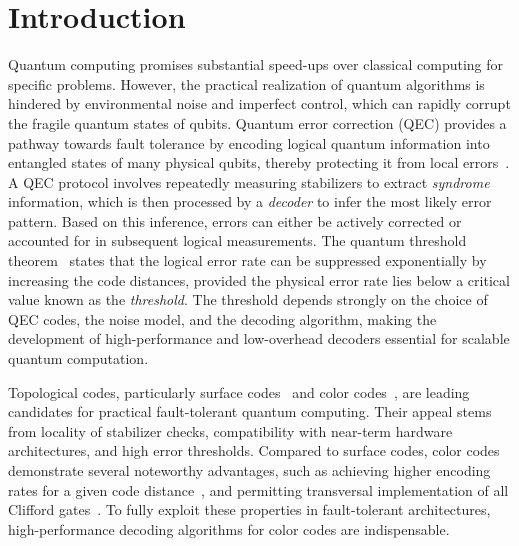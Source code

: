 \documentclass[%
 reprint,
 amsmath,amssymb,
 aps,
]{revtex4-2}
\begin{document}
\maketitle


\section{\label{sec:introduction}Introduction}

Quantum computing promises substantial speed-ups over 
classical computing for specific problems. However, the practical realization of quantum algorithms is hindered by environmental noise and imperfect control, which can rapidly corrupt the fragile quantum states of qubits. Quantum error correction (QEC) provides a pathway towards fault tolerance by encoding logical quantum information into entangled states of many physical qubits, thereby protecting it from local errors~\cite{shor1995scheme,shor1996fault,calderbank1996good,terhal2015quantum}. A QEC protocol involves repeatedly measuring stabilizers to extract \textit{syndrome} information, which is then processed by a \textit{decoder} to infer the most likely error pattern. Based on this inference, errors can either be actively corrected or accounted for in subsequent logical measurements.
The quantum threshold theorem~\cite{aharonov1997fault,preskill1998reliable,shor1996fault} states that the logical error rate can be suppressed exponentially by increasing the code distances, provided the physical error rate lies below a critical value known as the \textit{threshold}. The threshold depends strongly on the choice of QEC codes, the noise model, and the decoding algorithm, making the development of high-performance and low-overhead decoders essential for scalable quantum computation.

Topological codes, particularly surface codes~\cite{kitaev2003fault, bravyi1998quantum, dennis2002topological, Fowler2012surface} and color codes~\cite{bombin2006topological, bombin2007topological, bombin2015gauge, Kubica2015universal, kubica2018abcs}, are leading candidates for practical fault-tolerant quantum computing. Their appeal stems from locality of stabilizer checks, compatibility with near-term hardware architectures, and high error thresholds. Compared to surface codes, color codes demonstrate several noteworthy advantages, such as achieving higher encoding rates for a given code distance~\cite{landahl2011fault}, and permitting transversal implementation of all Clifford gates~\cite{bombin2006topological}. To fully exploit these properties in fault-tolerant architectures, high-performance decoding algorithms for color codes are indispensable.
\end{document}
